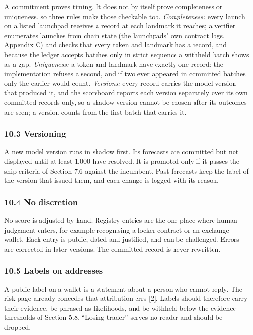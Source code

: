 A commitment proves timing. It does not by itself prove completeness or uniqueness, so three rules make those checkable too. \emph{Completeness:} every launch on a listed launchpad receives a record at each landmark it reaches; a verifier enumerates launches from chain state (the launchpads' own contract logs, Appendix C) and checks that every token and landmark has a record, and because the ledger accepts batches only in strict sequence a withheld batch shows as a gap. \emph{Uniqueness:} a token and landmark have exactly one record; the implementation refuses a second, and if two ever appeared in committed batches only the earlier would count. \emph{Versions:} every record carries the model version that produced it, and the scoreboard reports each version separately over its own committed records only, so a shadow version cannot be chosen after its outcomes are seen; a version counts from the first batch that carries it.

\subsubsection{10.3 Versioning}\label{versioning}

A new model version runs in shadow first. Its forecasts are committed but not displayed until at least 1,000 have resolved. It is promoted only if it passes the ship criteria of Section 7.6 against the incumbent. Past forecasts keep the label of the version that issued them, and each change is logged with its reason.

\subsubsection{10.4 No discretion}\label{no-discretion}

No score is adjusted by hand. Registry entries are the one place where human judgement enters, for example recognising a locker contract or an exchange wallet. Each entry is public, dated and justified, and can be challenged. Errors are corrected in later versions. The committed record is never rewritten.

\subsubsection{10.5 Labels on addresses}\label{labels-on-addresses}

A public label on a wallet is a statement about a person who cannot reply. The risk page already concedes that attribution errs {[}2{]}. Labels should therefore carry their evidence, be phrased as likelihoods, and be withheld below the evidence thresholds of Section 5.8. ``Losing trader'' serves no reader and should be dropped.

